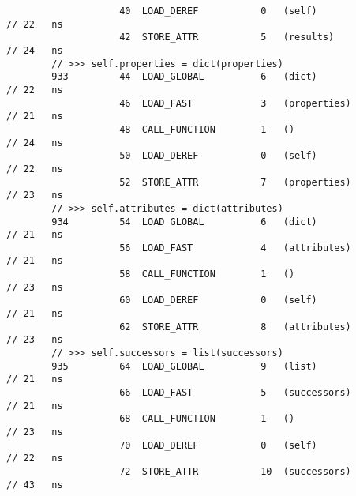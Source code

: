 \begin{code}
\begin{verbatim}
                    40  LOAD_DEREF           0   (self)                                             // 22   ns
                    42  STORE_ATTR           5   (results)                                          // 24   ns
        // >>> self.properties = dict(properties)
        933         44  LOAD_GLOBAL          6   (dict)                                             // 22   ns
                    46  LOAD_FAST            3   (properties)                                       // 21   ns
                    48  CALL_FUNCTION        1   ()                                                 // 24   ns
                    50  LOAD_DEREF           0   (self)                                             // 22   ns
                    52  STORE_ATTR           7   (properties)                                       // 23   ns
        // >>> self.attributes = dict(attributes)
        934         54  LOAD_GLOBAL          6   (dict)                                             // 21   ns
                    56  LOAD_FAST            4   (attributes)                                       // 21   ns
                    58  CALL_FUNCTION        1   ()                                                 // 23   ns
                    60  LOAD_DEREF           0   (self)                                             // 21   ns
                    62  STORE_ATTR           8   (attributes)                                       // 23   ns
        // >>> self.successors = list(successors)
        935         64  LOAD_GLOBAL          9   (list)                                             // 21   ns
                    66  LOAD_FAST            5   (successors)                                       // 21   ns
                    68  CALL_FUNCTION        1   ()                                                 // 23   ns
                    70  LOAD_DEREF           0   (self)                                             // 22   ns
                    72  STORE_ATTR           10  (successors)                                       // 43   ns


\end{verbatim}
\end{code}
